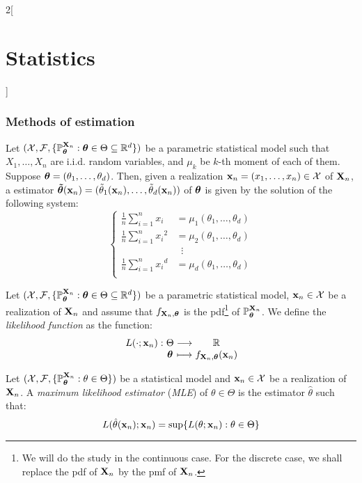 \documentclass[../../../main.tex]{subfiles}
\begin{document}
\begin{multicols}{2}[\section{Statistics}]
  \subsubsection{Methods of estimation}
  \begin{definition}
    Let $(\mathcal{X},\mathcal{F},\{\mathbb{P}_{\boldsymbol{\mathrm{\theta}}}^{\boldsymbol{\mathrm{X}}_n}:\boldsymbol{\mathrm{\theta}}\in\Theta\subseteq \mathbb{R}^d\})$ be a parametric statistical model such that $X_1,\ldots,X_n$ are i.i.d. random variables, and $\mu_k$ be $k$-th moment of each of them. Suppose $\boldsymbol{\mathrm{\theta}}=(\theta_1,\ldots,\theta_d)$. Then, given a realization $\boldsymbol{\mathrm{x}}_n=(x_1,\ldots,x_n)\in\mathcal{X}$ of $\boldsymbol{\mathrm{X}}_n$, a estimator $\boldsymbol{\mathrm{\tilde{\theta}}}(\boldsymbol{\mathrm{x}}_n)=(\tilde{\theta}_1(\boldsymbol{\mathrm{x}}_n),\ldots,\tilde{\theta}_d(\boldsymbol{\mathrm{x}}_n))$ of $\boldsymbol{\mathrm{\theta}}$ is given by the solution of the following system:
    $$
      \left\{
      \begin{aligned}
        \frac{1}{n}\sum_{i=1}^nx_i     & =\mu_1(\theta_1,\ldots,\theta_d) \\
        \frac{1}{n}\sum_{i=1}^n{x_i}^2 & =\mu_2(\theta_1,\ldots,\theta_d) \\
                                       & \;\;\vdots                       \\
        \frac{1}{n}\sum_{i=1}^n{x_i}^d & =\mu_d(\theta_1,\ldots,\theta_d) \\
      \end{aligned}
      \right.
    $$
  \end{definition}
  \begin{definition}[Likelihood]
    Let $(\mathcal{X},\mathcal{F},\{\mathbb{P}_{\boldsymbol{\mathrm{\theta}}}^{\boldsymbol{\mathrm{X}}_n}:\boldsymbol{\mathrm{\theta}}\in\Theta\subseteq \mathbb{R}^d\})$ be a parametric statistical model, $\boldsymbol{\mathrm{x}}_n\in\mathcal{X}$ be a realization of $\boldsymbol{\mathrm{X}}_n$ and assume that $f_{\boldsymbol{\mathrm{X}}_n,\boldsymbol{\mathrm{\theta}}}$ is the pdf\footnote{We will do the study in the continuous case. For the discrete case, we shall replace the pdf of $\boldsymbol{\mathrm{X}}_n$ by the pmf of $\boldsymbol{\mathrm{X}}_n$.} of $\mathbb{P}_{\boldsymbol{\mathrm{\theta}}}^{\boldsymbol{\mathrm{X}}_n}$. We define the \emph{likelihood function} as the function:
    $$\function{L(\cdot;\vf{x}_n)}{\Theta}{\RR}{\vf\theta}{f_{\vf{X}_n,\vf{\theta}}(\vf{x}_n)}$$
  \end{definition}
  \begin{definition}
    Let $(\mathcal{X},\mathcal{F},\{\mathbb{P}_{\boldsymbol{\mathrm{\theta}}}^{\boldsymbol{\mathrm{X}}_n}:\theta\in\Theta\})$ be a statistical model and $\boldsymbol{\mathrm{x}}_n\in\mathcal{X}$ be a realization of $\boldsymbol{\mathrm{X}}_n$. A \emph{maximum likelihood estimator} (\emph{MLE}) of $\theta\in\Theta$ is the estimator $\hat{\theta}$ such that: $$L(\hat{\theta}(\boldsymbol{\mathrm{x}}_n);\boldsymbol{\mathrm{x}}_n)=\sup\{L(\theta;\boldsymbol{\mathrm{x}}_n):\theta\in\Theta\}$$

\end{definition}
\end{multicols}
\end{document}
